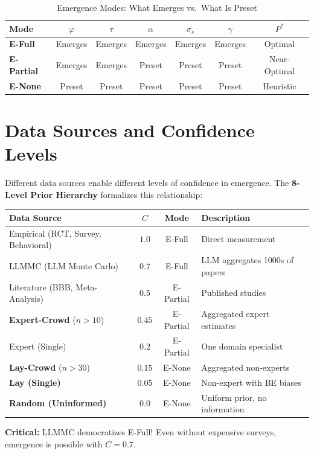 \begin{table}[htbp]
\centering
\caption{Emergence Modes: What Emerges vs.\ What Is Preset}
\label{tab:ie-emergence-modes}
\renewcommand{\arraystretch}{1.3}
\begin{tabular}{@{}lcccccc@{}}
\toprule
\textbf{Mode} & $\varphi$ & $\tau$ & $\alpha$ & $\sigma_s$ & $\gamma$ & $P^*$ \\
\midrule
\textbf{E-Full} & Emerges & Emerges & Emerges & Emerges & Emerges & Optimal \\
\textbf{E-Partial} & Emerges & Emerges & Preset & Preset & Preset & Near-Optimal \\
\textbf{E-None} & Preset & Preset & Preset & Preset & Preset & Heuristic \\
\bottomrule
\end{tabular}
\end{table}


\section{Data Sources and Confidence Levels}
\label{sec:ie-data-sources}

\begin{tcolorbox}[colback=yellow!5!white, colframe=yellow!75!black,
    title=\textbf{Key Insight: Data Source Determines Emergence Feasibility}]

Different data sources enable different levels of confidence in emergence. The \textbf{8-Level Prior Hierarchy} formalizes this relationship:

\begin{center}
\renewcommand{\arraystretch}{1.3}
\begin{tabular}{@{}lccl@{}}
\toprule
\textbf{Data Source} & \textbf{$C$} & \textbf{Mode} & \textbf{Description} \\
\midrule
Empirical (RCT, Survey, Behavioral) & $1.0$ & E-Full & Direct measurement \\
LLMMC (LLM Monte Carlo) & $0.7$ & E-Full & LLM aggregates 1000s of papers \\
Literature (BBB, Meta-Analysis) & $0.5$ & E-Partial & Published studies \\
\textbf{Expert-Crowd} ($n > 10$) & $0.45$ & E-Partial & Aggregated expert estimates \\
Expert (Single) & $0.2$ & E-Partial & One domain specialist \\
\textbf{Lay-Crowd} ($n > 30$) & $0.15$ & E-None & Aggregated non-experts \\
\textbf{Lay (Single)} & $0.05$ & E-None & Non-expert with BE biases \\
\textbf{Random (Uninformed)} & $0.0$ & E-None & Uniform prior, no information \\
\bottomrule
\end{tabular}
\end{center}

\textbf{Critical:} LLMMC democratizes E-Full! Even without expensive surveys, emergence is possible with $C = 0.7$.
\end{tcolorbox}

